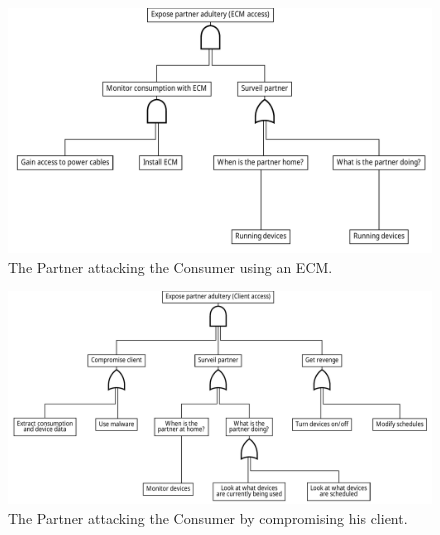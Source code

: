 \begin{figure}[h]
  \centering
  \includegraphics[width=\textwidth]{figures/graphviz/partner_vs_consumer_ecm.pdf}
  \caption{The Partner attacking the Consumer using an ECM.}
  \label{fig:attack_trees:partner:cheater_ecm}
\end{figure}


\begin{figure}
  \includegraphics[width=\textwidth]{figures/graphviz/partner_vs_consumer_client.pdf}
  \caption{The Partner attacking the Consumer by compromising his client.}
  \label{fig:attack_trees:partner:cheater_client}
\end{figure}


